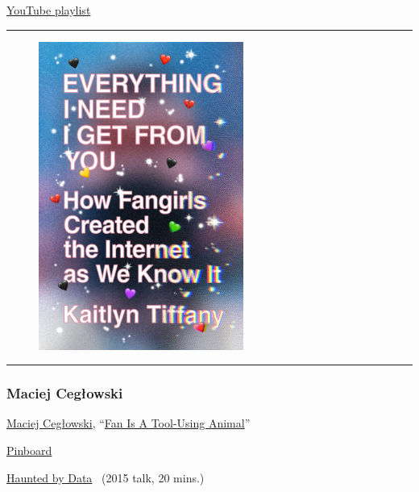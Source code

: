 \documentclass[
  letterpaper,
  DIV=11,
  numbers=noendperiod,
  oneside]{scrartcl}
\begin{document}
\href{https://www.youtube.com/playlist?list=PL3uFXkpHLYM7Qmw6Bw1tdTG0Th7xhrVHF}{YouTube
playlist}

\begin{center}\rule{0.5\linewidth}{0.5pt}\end{center}

\begin{figure}

\href{https://us.macmillan.com/books/9780374539184/everythingineedigetfromyou}{\includegraphics[width=0.6\textwidth,height=\textheight]{../img/kaitlyn-tiffany.jpeg}}

\end{figure}

\begin{center}\rule{0.5\linewidth}{0.5pt}\end{center}

\hypertarget{maciej-cegux142owski}{%
\subsubsection{Maciej Cegłowski}\label{maciej-cegux142owski}}

\href{https://idlewords.com/about.htm}{Maciej Cegłowski},
``\href{https://idlewords.com/talks/fan_is_a_tool_using_animal.htm}{Fan
Is A Tool-Using Animal}''

\href{http://pinboard.in/}{Pinboard}

\href{https://idlewords.com/talks/haunted_by_data.htm}{Haunted by Data}~
(2015 talk, 20 mins.)
\end{document}

